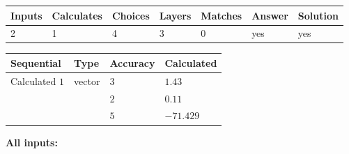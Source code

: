 \documentclass[12pt]{article}
\begin{document}
 
 
\noindent{}
 
 

 
 
\vspace{0.3in}
   
   
   
   
\noindent\begin{tabular}{|l|l|l|l|l|l|l|}
 \hline
Inputs & Calculates & Choices & Layers & Matches & Answer & Solution \\ \hline
           2  & 
           1  & 
           4
  & 
           3  & 
           0  & 
  yes & 
  yes 
  \\ \hline
 \end{tabular}
   
   
   
   
\noindent{}
   
   
  
  
\noindent\begin{tabular}{|l|l|l|l|}
\hline
 Sequential & Type & Accuracy & Calculated \\ 
\hline
 
 
  Calculated $            1 $ & vector &  
  $            3  $ 
 &  $ 1.43 $ 
 \\    
  & & 
  $            2  $ 
 &  $ 0.11 $ 
 \\    
  & & 
  $            5  $ 
 &  $ -71.429 $ 
 \\  \hline  
 \end{tabular}
   
   
   
   
\noindent\vspace{0.1in}\hspace{-0.08in} {\textbf{\Large{All inputs: }}}
   
   
  
\end{document}
